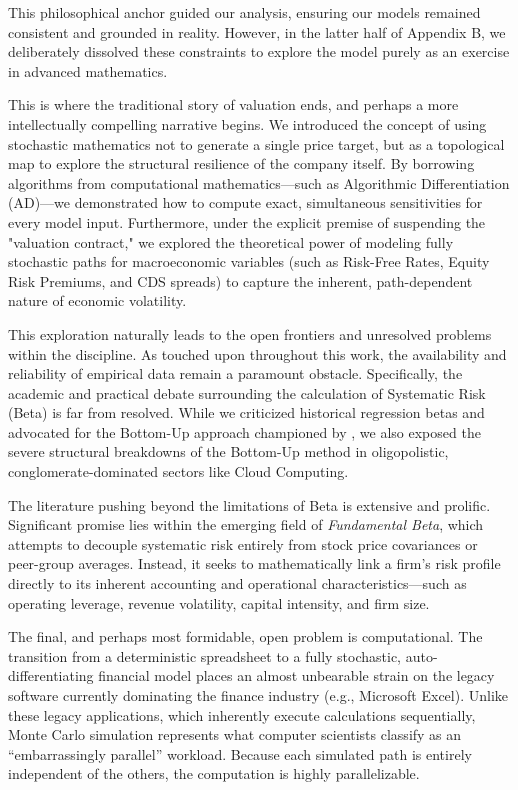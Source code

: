 This philosophical anchor guided our analysis, ensuring our models remained consistent and grounded in reality. However, in the latter half of Appendix B, we deliberately dissolved these constraints to explore the model purely as an exercise in advanced mathematics.

This is where the traditional story of valuation ends, and perhaps a more intellectually compelling narrative begins. We introduced the concept of using stochastic mathematics not to generate a single price target, but as a topological map to explore the structural resilience of the company itself. By borrowing algorithms from computational mathematics—such as Algorithmic Differentiation (AD)—we demonstrated how to compute exact, simultaneous sensitivities for every model input. Furthermore, under the explicit premise of suspending the "valuation contract," we explored the theoretical power of modeling fully stochastic paths for macroeconomic variables (such as Risk-Free Rates, Equity Risk Premiums, and CDS spreads) to capture the inherent, path-dependent nature of economic volatility.

This exploration naturally leads to the open frontiers and unresolved problems within the discipline. As touched upon throughout this work, the availability and reliability of empirical data remain a paramount obstacle. Specifically, the academic and practical debate surrounding the calculation of Systematic Risk (Beta) is far from resolved. While we criticized historical regression betas and advocated for the Bottom-Up approach championed by \textcite{damodaran_risk_parameters}, we also exposed the severe structural breakdowns of the Bottom-Up method in oligopolistic, conglomerate-dominated sectors like Cloud Computing.

The literature pushing beyond the limitations of Beta is extensive and prolific. Significant promise lies within the emerging field of \textit{Fundamental Beta}, which attempts to decouple systematic risk entirely from stock price covariances or peer-group averages. Instead, it seeks to mathematically link a firm's risk profile directly to its inherent accounting and operational characteristics—such as operating leverage, revenue volatility, capital intensity, and firm size.

The final, and perhaps most formidable, open problem is computational. The transition from a deterministic spreadsheet to a fully stochastic, auto-differentiating financial model places an almost unbearable strain on the legacy software currently dominating the finance industry (e.g., Microsoft Excel). Unlike these legacy applications, which inherently execute calculations sequentially, Monte Carlo simulation represents what computer scientists classify as an ``embarrassingly parallel'' workload. Because each simulated path is entirely independent of the others, the computation is highly parallelizable.

